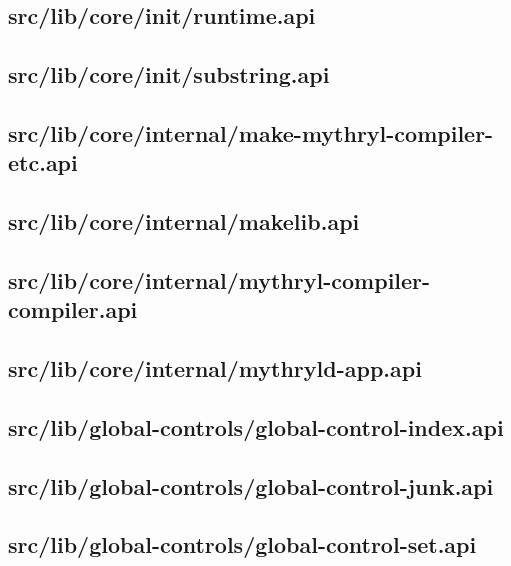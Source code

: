 \subsection{src/lib/core/init/runtime.api}


\subsection{src/lib/core/init/substring.api}


\subsection{src/lib/core/internal/make-mythryl-compiler-etc.api}


\subsection{src/lib/core/internal/makelib.api}


\subsection{src/lib/core/internal/mythryl-compiler-compiler.api}


\subsection{src/lib/core/internal/mythryld-app.api}


\subsection{src/lib/global-controls/global-control-index.api}


\subsection{src/lib/global-controls/global-control-junk.api}


\subsection{src/lib/global-controls/global-control-set.api}


